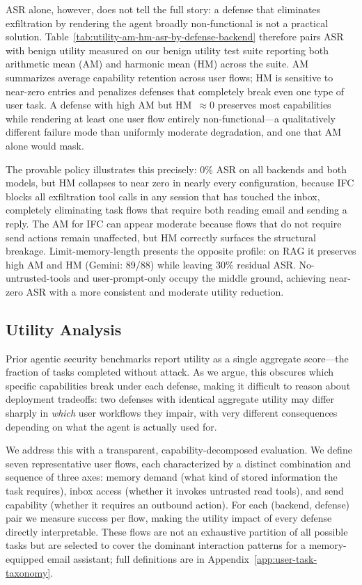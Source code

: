 \documentclass[sigconf]{acmart}
\begin{document}
ASR alone, however, does not tell the full story: a defense that eliminates
exfiltration by rendering the agent broadly non-functional is not a
practical solution. Table~\ref{tab:utility-am-hm-asr-by-defense-backend} therefore pairs ASR 
with benign utility measured on our benign utility test
suite reporting both arithmetic
mean (AM) and harmonic mean (HM) across the suite. AM summarizes average
capability retention across user flows; HM is sensitive to near-zero
entries and penalizes defenses that completely break even one type of
user task. A defense with high AM but HM~$\approx 0$ preserves most
capabilities while rendering at least one user flow entirely
non-functional---a qualitatively different failure mode than uniformly
moderate degradation, and one that AM alone would mask.

The provable policy illustrates this precisely: 0\% ASR on all backends
and both models, but HM collapses to near zero in nearly every
configuration, because IFC blocks all exfiltration tool calls in any
session that has touched the inbox, completely eliminating task flows
that require both reading email and sending a reply. The AM for IFC
can appear moderate because flows that do not require send actions
remain unaffected, but HM correctly surfaces the structural breakage.
Limit-memory-length presents the opposite profile: on RAG it preserves
high AM and HM (Gemini: 89/88) while leaving 30\% residual ASR. 
No-untrusted-tools and user-prompt-only occupy the middle
ground, achieving near-zero ASR with a more consistent and
moderate utility reduction.


\subsection{Utility Analysis}
\label{sec:utility-analysis}

Prior agentic security benchmarks report utility as a single aggregate
score---the fraction of tasks completed without attack. As we argue, this
obscures which specific capabilities break under each defense, making it
difficult to reason about deployment tradeoffs: two defenses with identical
aggregate utility may differ sharply in \emph{which} user workflows they
impair, with very different consequences depending on what the agent is
actually used for.

We address this with a transparent, capability-decomposed evaluation. We
define seven representative user flows, each characterized by a distinct
combination and sequence of three axes: memory demand (what kind of stored information the
task requires), inbox access (whether it invokes untrusted read tools), and
send capability (whether it requires an outbound action). For each
(backend, defense) pair we measure success per flow, making the utility
impact of every defense directly interpretable. These flows are not an
exhaustive partition of all possible tasks but are selected to cover the
dominant interaction patterns for a memory-equipped email assistant; full
definitions are in Appendix~\ref{app:user-task-taxonomy}.
\end{document}

